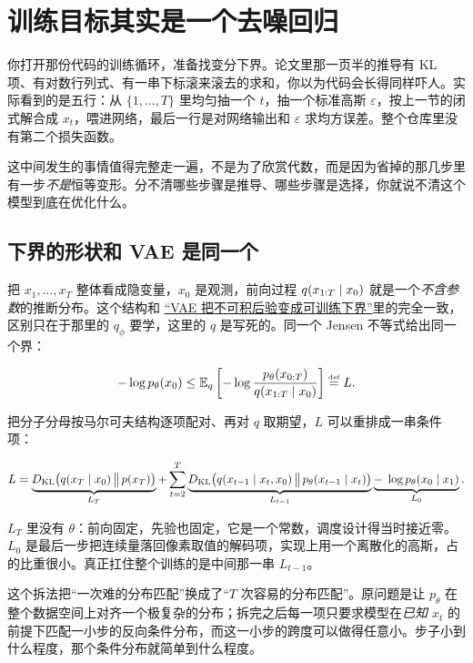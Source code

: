\section{训练目标其实是一个去噪回归}
\label{sec:14-Deep-Learning/08-Diffusion-Models/02}

你打开那份代码的训练循环，准备找变分下界。论文里那一页半的推导有 KL 项、有对数行列式、有一串下标滚来滚去的求和，你以为代码会长得同样吓人。实际看到的是五行：从 \(\{1,\dots,T\}\) 里均匀抽一个 \(t\)，抽一个标准高斯 \(\varepsilon\)，按上一节的闭式解合成 \(x_t\)，喂进网络，最后一行是对网络输出和 \(\varepsilon\) 求均方误差。整个仓库里没有第二个损失函数。

这中间发生的事情值得完整走一遍，不是为了欣赏代数，而是因为省掉的那几步里有一步\emph{不是}恒等变形。分不清哪些步骤是推导、哪些步骤是选择，你就说不清这个模型到底在优化什么。

\subsection{下界的形状和 VAE 是同一个}

把 \(x_1,\dots,x_T\) 整体看成隐变量，\(x_0\) 是观测，前向过程 \(q(x_{1:T}\mid x_0)\) 就是一个\emph{不含参数}的推断分布。这个结构和 \hyperref[sec:14-Deep-Learning/06-Variational-Autoencoders/01]{``VAE 把不可积后验变成可训练下界''}里的完全一致，区别只在于那里的 \(q_\phi\) 要学，这里的 \(q\) 是写死的。同一个 Jensen 不等式给出同一个界：

\[
-\log p_\theta(x_0) \le \mathbb{E}_q\left[-\log\frac{p_\theta(x_{0:T})}{q(x_{1:T}\mid x_0)}\right] \stackrel{\text{\tiny def}}{=} L .
\]

把分子分母按马尔可夫结构逐项配对、再对 \(q\) 取期望，\(L\) 可以重排成一串条件项：

\[
L = \underbrace{D_{\mathrm{KL}}\bigl(q(x_T\mid x_0)\,\big\|\,p(x_T)\bigr)}_{L_T}
+ \sum_{t=2}^{T}\underbrace{D_{\mathrm{KL}}\bigl(q(x_{t-1}\mid x_t,x_0)\,\big\|\,p_\theta(x_{t-1}\mid x_t)\bigr)}_{L_{t-1}}
\underbrace{-\;\log p_\theta(x_0\mid x_1)}_{L_0}.
\]

\(L_T\) 里没有 \(\theta\)：前向固定，先验也固定，它是一个常数，调度设计得当时接近零。\(L_0\) 是最后一步把连续量落回像素取值的解码项，实现上用一个离散化的高斯，占的比重很小。真正扛住整个训练的是中间那一串 \(L_{t-1}\)。

这个拆法把``一次难的分布匹配''换成了``\(T\) 次容易的分布匹配''。原问题是让 \(p_\theta\) 在整个数据空间上对齐一个极复杂的分布；拆完之后每一项只要求模型在\emph{已知 \(x_t\)} 的前提下匹配一小步的反向条件分布，而这一小步的跨度可以做得任意小。步子小到什么程度，那个条件分布就简单到什么程度。

